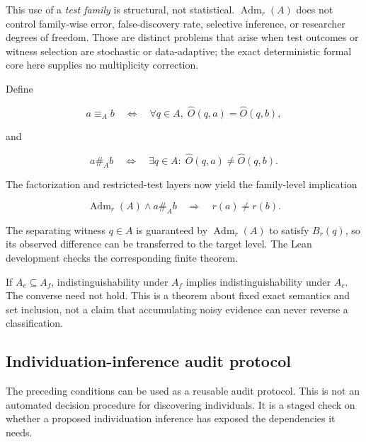 \documentclass[11pt]{article}
\begin{document}
This use of a \emph{test family} is structural, not statistical. \(\operatorname{Adm}_r(A)\) does not control family-wise error, false-discovery rate, selective inference, or researcher degrees of freedom. Those are distinct problems that arise when test outcomes or witness selection are stochastic or data-adaptive; the exact deterministic formal core here supplies no multiplicity correction.

Define

\[
a\equiv_A b
\quad\Longleftrightarrow\quad
\forall q\in A,\;
\widehat O(q,a)=\widehat O(q,b),
\]

and

\[
a\mathrel{\#_A}b
\quad\Longleftrightarrow\quad
\exists q\in A:\;
\widehat O(q,a)\neq\widehat O(q,b).
\]

The factorization and restricted-test layers now yield the family-level implication

\[
\operatorname{Adm}_r(A)
\land
a\mathrel{\#_A}b
\quad\Longrightarrow\quad
r(a)\neq r(b).
\]

The separating witness \(q\in A\) is guaranteed by \(\operatorname{Adm}_r(A)\) to satisfy \(B_r(q)\), so its observed difference can be transferred to the target level. The Lean development checks the corresponding finite theorem.

If \(A_c\subseteq A_f\), indistinguishability under \(A_f\) implies indistinguishability under \(A_c\). The converse need not hold. This is a theorem about fixed exact semantics and set inclusion, not a claim that accumulating noisy evidence can never reverse a classification.

\subsection{Individuation-inference audit protocol}

The preceding conditions can be used as a reusable audit protocol. This is not an automated decision procedure for discovering individuals. It is a staged check on whether a proposed individuation inference has exposed the dependencies it needs.
\end{document}
